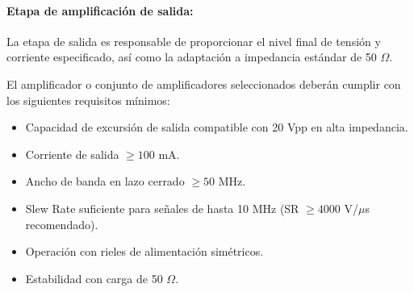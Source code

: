 
\paragraph{Etapa de amplificación de salida:}
La etapa de salida es responsable de proporcionar el nivel final de tensión y corriente especificado, así como la adaptación a impedancia estándar de 50 $\Omega$.

El amplificador o conjunto de amplificadores seleccionados deberán cumplir con los siguientes requisitos mínimos:

\begin{itemize}[label=\textbullet]
	\item Capacidad de excursión de salida compatible con 20 Vpp en alta impedancia.
	\item Corriente de salida $\geq 100$ mA.
	\item Ancho de banda en lazo cerrado $\geq 50$ MHz.
	\item Slew Rate suficiente para señales de hasta 10 MHz (SR $\geq 4000$ V/$\mu$s recomendado).
	\item Operación con rieles de alimentación simétricos.
	\item Estabilidad con carga de 50 $\Omega$.
\end{itemize}


